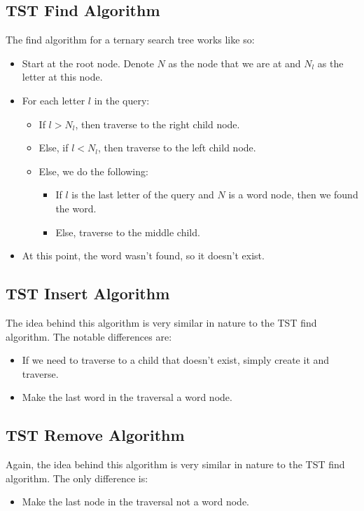 \documentclass[letterpaper]{article}
\begin{document}
\subsection{TST Find Algorithm}
The find algorithm for a ternary search tree works like so: 
\begin{itemize}
    \item Start at the root node. Denote $N$ as the node that we are at and $N_l$ as the letter at this node. 
    \item For each letter $l$ in the query: 
    \begin{itemize}
        \item If $l > N_l$, then traverse to the right child node. 
        \item Else, if $l < N_l$, then traverse to the left child node. 
        \item Else, we do the following: 
        \begin{itemize}
            \item If $l$ is the last letter of the query and $N$ is a word node, then we found the word. 
            \item Else, traverse to the middle child. 
        \end{itemize}
    \end{itemize}
    \item At this point, the word wasn't found, so it doesn't exist. 
\end{itemize}

\subsection{TST Insert Algorithm}
The idea behind this algorithm is very similar in nature to the TST find algorithm. The notable differences are: 
\begin{itemize}
    \item If we need to traverse to a child that doesn't exist, simply create it and traverse. 
    \item Make the last word in the traversal a word node. 
\end{itemize}

\subsection{TST Remove Algorithm}
Again, the idea behind this algorithm is very similar in nature to the TST find algorithm. The only difference is: 
\begin{itemize}
    \item Make the last node in the traversal not a word node. 
\end{itemize}
\end{document}

